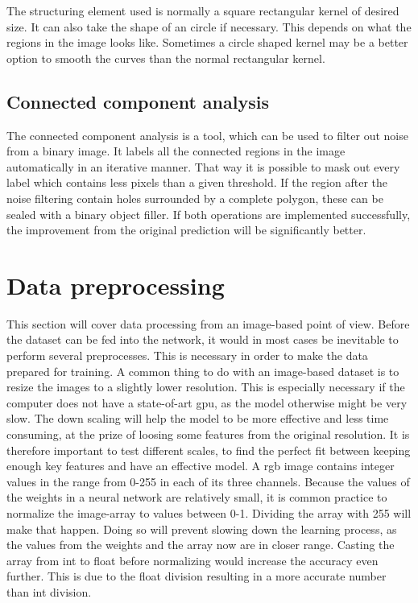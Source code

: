 \documentclass[USenglish]{ifimaster}  %
\begin{document}
The structuring element used is normally a square rectangular kernel of desired size. It can also take the shape of an circle if necessary. This depends on what the regions in the image looks like. Sometimes a circle shaped kernel may be a better option to smooth the curves than the normal rectangular kernel.

\subsection{Connected component analysis}
The connected component analysis is a tool, which can be used to filter out noise from a binary image. It labels all the connected regions in the image automatically in an iterative manner. That way it is possible to mask out every label which contains less pixels than a given threshold. If the region after the noise filtering contain holes surrounded by a complete polygon, these can be sealed with a binary object filler. If both operations are implemented successfully, the improvement from the original prediction will be significantly better.

\section{Data preprocessing}
This section will cover data processing from an image-based point of view. Before the dataset can be fed into the network, it would in most cases be inevitable to perform several preprocesses. This is necessary in order to make the data prepared for training. 
\newline
A common thing to do with an image-based dataset is to resize the images to a slightly lower resolution. This is especially necessary if the computer does not have a state-of-art \ac{gpu}, as the model otherwise might be very slow. The down scaling will help the model to be more effective and less time consuming, at the prize of loosing some features from the original resolution. It is therefore important to test different scales, to find the perfect fit between keeping enough key features and have an effective model.
\newline
A \ac{rgb} image contains integer values in the range from 0-255 in each of its three channels. Because the values of the weights in a neural network are relatively small, it is common practice to normalize the image-array to values between 0-1. Dividing the array with 255 will make that happen. Doing so will prevent slowing down the learning process, as the values from the weights and the array now are in closer range. Casting the array from int to float before normalizing would increase the accuracy even further. This is due to the float division resulting in a more accurate number than int division.
\end{document}
